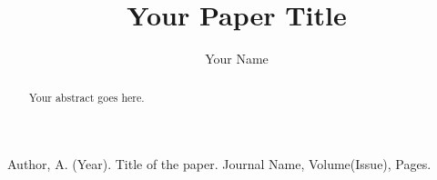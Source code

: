 \documentclass{article}
\title{Your Paper Title}
\author{Your Name}
\date{}  %
\begin{document}
\maketitle

\begin{abstract}
Your abstract goes here.
\end{abstract}







\begin{thebibliography}{9}
 Author, A. (Year). Title of the paper. Journal Name, Volume(Issue), Pages.
\end{thebibliography}
\end{document}
